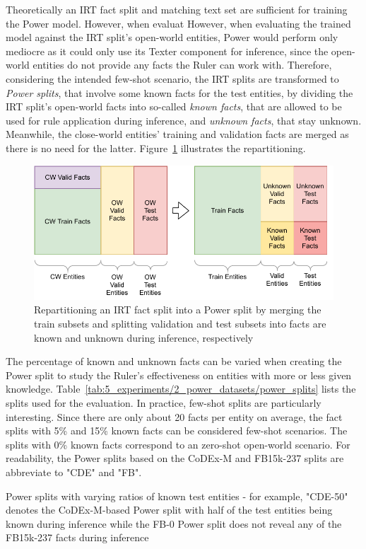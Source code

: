 Theoretically an IRT fact split and matching text set are sufficient for training the Power model. However, when evaluat However, when evaluating the trained model against the IRT split's open-world entities, Power would perform only mediocre as it could only use its Texter component for inference, since the open-world entities do not provide any facts the Ruler can work with. Therefore, considering the intended few-shot scenario, the IRT splits are transformed to \emph{Power splits}, that involve some known facts for the test entities, by dividing the IRT split's open-world facts into so-called \emph{known facts}, that are allowed to be used for rule application during inference, and \emph{unknown facts}, that stay unknown. Meanwhile, the close-world entities' training and validation facts are merged as there is no need for the latter. Figure~\ref{fig:5_experiments/2_power_datasets/power_split} illustrates the repartitioning.

\begin{figure}[t]
    \centering
    \includegraphics[width=\textwidth]{5_experiments/2_power_datasets/power_split}
    \caption{Repartitioning an IRT fact split into a Power split by merging the train subsets and splitting validation and test subsets into facts are known and unknown during inference, respectively}
    \label{fig:5_experiments/2_power_datasets/power_split}
\end{figure}

The percentage of known and unknown facts can be varied when creating the Power split to study the Ruler's effectiveness on entities with more or less given knowledge. Table~\ref{tab:5_experiments/2_power_datasets/power_splits} lists the splits used for the evaluation. In practice, few-shot splits are particularly interesting. Since there are only about 20 facts per entity on average, the fact splits with 5\% and 15\% known facts can be considered few-shot scenarios. The splits with 0\% known facts correspond to an zero-shot open-world scenario. For readability, the Power splits based on the CoDEx-M and FB15k-237 splits are abbreviate to "CDE" and "FB".

\begin{table}[h]
    \centering
    
    \caption{Power splits with varying ratios of known test entities - for example, "CDE-50" denotes the CoDEx-M-based Power split with half of the test entities being known during inference while the FB-0 Power split does not reveal any of the FB15k-237 facts during inference}
    \label{tab:5_experiments/2_power_datasets/power_splits}
\end{table}
